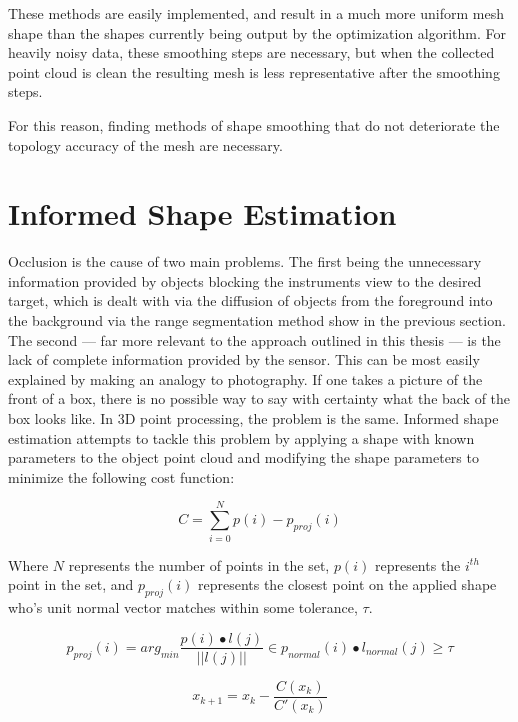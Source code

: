 \documentclass[12pt]{drexelthesis}
\let\Oldsection\section
\renewcommand{\section}{\FloatBarrier\Oldsection}
\begin{document}
These methods are easily implemented, and result in a much more uniform mesh shape than the shapes currently being output by the optimization algorithm. For heavily noisy data, these smoothing steps are necessary, but when the collected point cloud is clean the resulting mesh is less representative after the smoothing steps.

For this reason, finding methods of shape smoothing that do not deteriorate the topology accuracy of the mesh are necessary.

\section{Informed Shape Estimation}
\label{subsubsec:informedshape}
Occlusion is the cause of two main problems. The first being the unnecessary information provided by objects blocking the instruments view to the desired target, which is dealt with via the diffusion of objects from the foreground into the background via the range segmentation method show in the previous section. The second --- far more relevant to the approach outlined in this thesis --- is the lack of complete information provided by the sensor. This can be most easily explained by making an analogy to photography. If one takes a picture of the front of a box, there is no possible way to say with certainty what the back of the box looks like. In 3D point processing, the problem is the same. Informed shape estimation attempts to tackle this problem by applying a shape with known parameters to the object point cloud and modifying the shape parameters to minimize the following cost function:

\begin{equation}
	C = \sum_{i=0}^{N}{p(i) - p_{proj}(i)}
\end{equation}

Where $N$ represents the number of points in the set, $p(i)$ represents the $i^{th}$ point in the set, and $p_{proj}(i)$ represents the closest point on the applied shape who's unit normal vector matches within some tolerance, $\tau$.

\begin{equation}
	p_{proj}(i) = arg_{min} \frac{p(i) \bullet l(j)}{||l(j)||} \in p_{normal}(i) \bullet l_{normal}(j) \geq \tau
\end{equation}

\begin{equation}
	\label{eq:newtonraph}
	x_{k+1} = x_{k} - \frac{C(x_{k})}{C'(x_{k})}
\end{equation}
\end{document}

